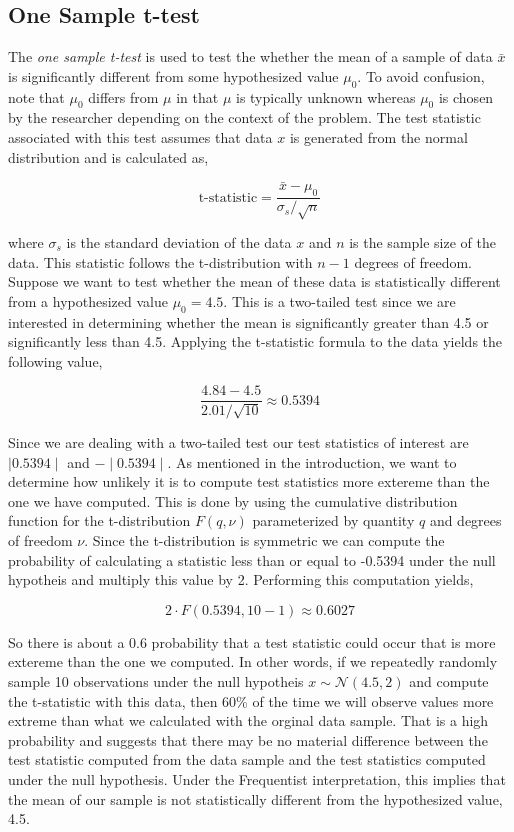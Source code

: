 \documentclass[12pt]{article}
\begin{document}
\subsection{One Sample t-test}

The \emph{one sample t-test} is used to test the whether the mean of a sample of data $\bar{x}$ is significantly different from some hypothesized value $\mu_0$. To avoid confusion, note that $\mu_0$ differs from $\mu$ in that $\mu$ is typically unknown whereas $\mu_0$ is chosen by the researcher depending on the context of the problem. The test statistic associated with this test assumes that data $x$ is generated from the normal distribution and is calculated as,

$$
\mbox{t-statistic} = \frac{\bar{x}-\mu_0}{\sigma_s/\sqrt{n}}
$$

\noindent where $\sigma_s$ is the standard deviation of the data $x$ and $n$ is the sample size of the data. This statistic follows the t-distribution with $n-1$ degrees of freedom. \\

\noindent Suppose we want to test whether the mean of these data is statistically different from a hypothesized value $\mu_0 = 4.5$. This is a two-tailed test since we are interested in determining whether the mean is significantly greater than 4.5 or significantly less than 4.5. Applying the t-statistic formula to the data yields the following value,

$$
\frac{4.84-4.5}{2.01/\sqrt{10}} \approx 0.5394
$$

\noindent Since we are dealing with a two-tailed test our test statistics of interest are $\mid 0.5394 \mid$ and $-\mid 0.5394 \mid$. As mentioned in the introduction, we want to determine how unlikely it is to compute test statistics more extereme than the one we have computed. This is done by using the cumulative distribution function for the t-distribution $F(q, \nu)$ parameterized by quantity $q$ and degrees of freedom $\nu$. Since the t-distribution is symmetric we can compute the probability of calculating a statistic less than or equal to -0.5394 under the null hypotheis and multiply this value by 2. Performing this computation yields,

$$
2 \cdot F(0.5394, 10-1) \approx 0.6027
$$

\noindent So there is about a 0.6 probability that a test statistic could occur that is more extereme than the one we computed. In other words, if we repeatedly randomly sample 10 observations under the null hypotheis $x \sim \mathcal{N}(4.5, 2)$ and compute the t-statistic with this data, then 60\% of the time we will observe values more extreme than what we calculated with the orginal data sample. That is a high probability and suggests that there may be no material difference between the test statistic computed from the data sample and the test statistics computed under the null hypothesis. Under the Frequentist interpretation, this implies that the mean of our sample is not statistically different from the hypothesized value, 4.5. \\
\end{document}
